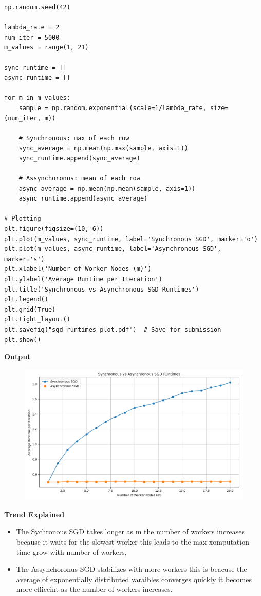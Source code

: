 \documentclass{article}
\begin{document}
\begin{enumerate}
\begin{verbatim}
np.random.seed(42)

lambda_rate = 2
num_iter = 5000
m_values = range(1, 21)

sync_runtime = []
async_runtime = []

for m in m_values:
    sample = np.random.exponential(scale=1/lambda_rate, size=(num_iter, m))

    # Synchronous: max of each row
    sync_average = np.mean(np.max(sample, axis=1))
    sync_runtime.append(sync_average)

    # Assynchoronus: mean of each row
    async_average = np.mean(np.mean(sample, axis=1))
    async_runtime.append(async_average)

# Plotting
plt.figure(figsize=(10, 6))
plt.plot(m_values, sync_runtime, label='Synchronous SGD', marker='o')
plt.plot(m_values, async_runtime, label='Asynchronous SGD', marker='s')
plt.xlabel('Number of Worker Nodes (m)')
plt.ylabel('Average Runtime per Iteration')
plt.title('Synchronous vs Asynchronous SGD Runtimes')
plt.legend()
plt.grid(True)
plt.tight_layout()
plt.savefig("sgd_runtimes_plot.pdf")  # Save for submission
plt.show()        
    \end{verbatim}

    \textbf{Output}
    \begin{figure}[H]
        \centering
        \includegraphics[width=1\textwidth]{SGD_simulation.png}
        \label{fig:sgd_runtimes}
    \end{figure}

    \textbf{Trend Explained}\\
    \begin{itemize}
        \item The Sychronous SGD takes longer as m the number of workers increases because it waits for the slowest worker this leads to the max xomputation time grow with number of workers,
        \item The Assynchoronus SGD stabilizes with more workers this is beacuse the average of exponentially distributed varaibles converges quickly it becomes more efficeint as the number of workers increases.
    \end{itemize}


\end{enumerate}
\end{document}
